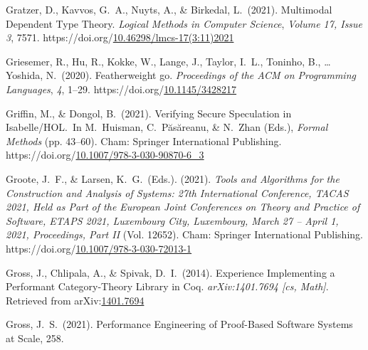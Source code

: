 \documentclass[12pt,twoside]{article}
\begin{document}
{\begin{thebibliography}{1079}
\mdbibitemlabel{}Gratzer, D., Kavvos, G.~A., Nuyts, A., \& Birkedal, L.~(2021). Multimodal Dependent Type Theory. \emph{Logical Methods in Computer Science}, \emph{Volume 17, Issue 3}, 7571. https://doi.org/\href{https://dx.doi.org/10.46298/lmcs-17\%25283:11\%25292021}{10.46298/lmcs-17(3:11)2021}%

\mdbibitemlabel{}Griesemer, R., Hu, R., Kokke, W., Lange, J., Taylor, I.~L., Toninho, B., … Yoshida, N.~(2020). Featherweight go. \emph{Proceedings of the ACM on Programming Languages}, \emph{4}, 1–29. https://doi.org/\href{https://dx.doi.org/10.1145/3428217}{10.1145/3428217}%

\mdbibitemlabel{}Griffin, M., \& Dongol, B.~(2021). Verifying Secure Speculation in Isabelle/HOL.~In M.~Huisman, C.~Păsăreanu, \& N.~Zhan (Eds.), \emph{Formal Methods} (pp. 43–60). Cham: Springer International Publishing. https://doi.org/\href{https://dx.doi.org/10.1007/978-3-030-90870-6_3}{10.1007/978-3-030-90870-6\_3}%

\mdbibitemlabel{}Groote, J.~F., \& Larsen, K.~G.~(Eds.). (2021). \emph{Tools and Algorithms for the Construction and Analysis of Systems: 27th International Conference, TACAS 2021, Held as Part of the European Joint Conferences on Theory and Practice of Software, ETAPS 2021, Luxembourg City, Luxembourg, March 27 – April 1, 2021, Proceedings, Part II} (Vol. 12652). Cham: Springer International Publishing. https://doi.org/\href{https://dx.doi.org/10.1007/978-3-030-72013-1}{10.1007/978-3-030-72013-1}%

\mdbibitemlabel{}Gross, J., Chlipala, A., \& Spivak, D.~I.~(2014). Experience Implementing a Performant Category-Theory Library in Coq. \emph{arXiv:1401.7694 {}[cs, Math]}. Retrieved from arXiv:\href{http://arxiv.org/abs/1401.7694}{1401.7694}%

\mdbibitemlabel{}Gross, J.~S.~(2021). Performance Engineering of Proof-Based Software Systems at Scale, 258.%


\end{thebibliography}}
\end{document}
